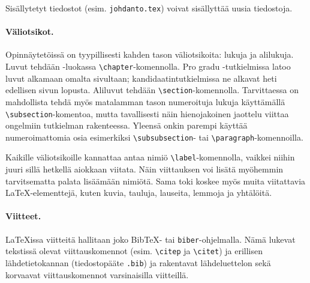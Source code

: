 Sisällytetyt tiedostot (esim. \texttt{johdanto.tex}) voivat sisällyttää uusia tiedostoja.

\paragraph{Väliotsikot.}
Opinnäytetöissä on tyypillisesti kahden tason väliotsikoita: lukuja ja alilukuja. Luvut tehdään \uefcsthesis-luokassa \verb+\chapter+-komennolla. Pro gradu \nobreakdash-tutkielmissa \uefcsthesis{} latoo luvut alkamaan omalta sivultaan; kandidaatintutkielmissa ne alkavat heti edellisen sivun lopusta. Aliluvut tehdään \verb+\section+-komennolla. Tarvittaessa on mahdollista tehdä myös matalamman tason numeroituja lukuja käyttämällä \verb+\subsection+-komentoa, mutta tavallisesti näin hienojakoinen jaottelu viittaa ongelmiin tutkielman rakenteessa. Yleensä onkin parempi käyttää numeroimattomia osia esimerkiksi \verb+\subsubsection+- tai \verb+\paragraph+-komennoilla.

Kaikille väliotsikoille kannattaa antaa nimiö \verb+\label+-komennolla, vaikkei niihin juuri sillä hetkellä aiokkaan viitata. Näin viittauksen voi lisätä myöhemmin tarvitsematta palata lisäämään nimiötä. Sama toki koskee myös muita viitattavia \LaTeX-elementtejä, kuten kuvia, tauluja, lauseita, lemmoja ja yhtälöitä.

\paragraph{Viitteet.}
\LaTeX{issa} viitteitä hallitaan joko Bib\TeX- tai \texttt{biber}-ohjelmalla. Nämä lukevat tekstissä olevat viittauskomennot (esim. \verb+\citep+ ja \verb+\citet+) ja erillisen lähdetietokannan (tiedostopääte \texttt{.bib}) ja rakentavat lähdeluettelon sekä korvaavat viittauskomennot varsinaisilla viitteillä. 

